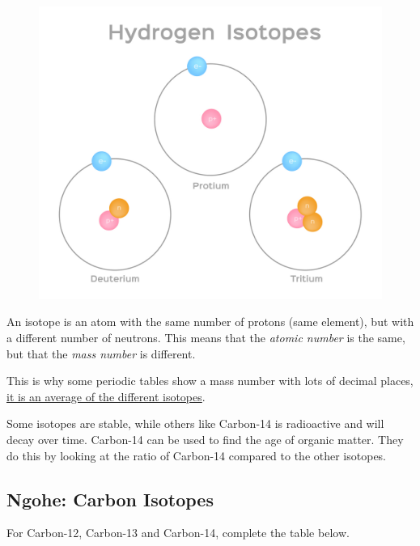 \documentclass[12pt]{report}
\begin{document}
\begin{figure}
	\vspace{-1cm}
	\begin{center}
		\includegraphics[width=0.9\linewidth]{isotopes.jpg}
	\end{center}
\end{figure}

An isotope is an atom with the same number of protons (same element), but with a different number of neutrons. This means that the \textit{atomic number} is the same, but that the \textit{mass number} is different.

This is why some periodic tables show a mass number with lots of decimal places, \underline{it is an average of the different isotopes}.

Some isotopes are stable, while others like Carbon-14 is radioactive and will decay over time. Carbon-14 can be used to find the age of organic matter. They do this by looking at the ratio of Carbon-14 compared to the other isotopes.

\subsection{Ngohe: Carbon Isotopes}

For Carbon-12, Carbon-13 and Carbon-14, complete the table below.
\end{document}
